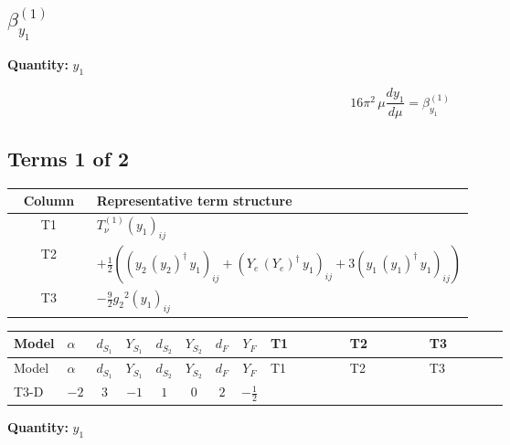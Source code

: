 \documentclass[8pt]{article}
\begin{document}
\begin{landscape}
\section*{$\beta_{y_1}^{(1)}$}
\noindent\textbf{Quantity: }$y_1$\par\smallskip
\[16\pi^2\,\mu\frac{d y_1}{d\mu}=\beta_{y_1}^{(1)}\]
\subsection*{Terms 1 of 2}
\begin{center}
\begin{tabular}{@{}c >{\raggedright\arraybackslash}p{0.82\linewidth}@{}}
\toprule
Column & Representative term structure \\
\midrule
T1 & \(\displaystyle T_{\nu}^{(1)} \left({y_1}\right)_{ij}\) \\
\midrule
T2 & \(\displaystyle +\frac{1}{2} (\left({y_2}\,\left({y_2}\right)^{\dagger}\,{y_1}\right)_{ij}+\left({Y_e}\,\left({Y_e}\right)^{\dagger}\,{y_1}\right)_{ij}+3 \left({y_1}\,\left({y_1}\right)^{\dagger}\,{y_1}\right)_{ij})\) \\
\midrule
T3 & \(\displaystyle -\frac{9}{2} {g_2}^2 \left({y_1}\right)_{ij}\) \\
\midrule
\bottomrule
\end{tabular}
\end{center}
\smallskip
\tiny
\begin{longtable}{@{}llcccccc >{\raggedright\arraybackslash}p{0.21\linewidth} >{\raggedright\arraybackslash}p{0.21\linewidth} >{\raggedright\arraybackslash}p{0.21\linewidth}@{}}
\toprule
Model & $\alpha$ & $d_{S_1}$ & $Y_{S_1}$ & $d_{S_2}$ & $Y_{S_2}$ & $d_F$ & $Y_F$ & T1 & T2 & T3 \\
\midrule
\endfirsthead
\toprule
Model & $\alpha$ & $d_{S_1}$ & $Y_{S_1}$ & $d_{S_2}$ & $Y_{S_2}$ & $d_F$ & $Y_F$ & T1 & T2 & T3 \\
\midrule
\endhead
T3-D & $-2$ & $3$ & $-1$ & $1$ & $0$ & $2$ & $-\frac{1}{2}$ & \scriptsize\adjustbox{max width=\linewidth}{$\begin{gathered} T_{\nu}^{(1)} \left({y_1}\right)_{ij}\end{gathered}$} & \scriptsize\adjustbox{max width=\linewidth}{$\begin{gathered} +\frac{1}{2} (\left({y_2}\,\left({y_2}\right)^{\dagger}\,{y_1}\right)_{ij}+\left({Y_e}\,\left({Y_e}\right)^{\dagger}\,{y_1}\right)_{ij}+3 \left({y_1}\,\left({y_1}\right)^{\dagger}\,{y_1}\right)_{ij})\end{gathered}$} & \scriptsize\adjustbox{max width=\linewidth}{$\begin{gathered} -\frac{9}{2} {g_2}^2 \left({y_1}\right)_{ij}\end{gathered}$} \\
\midrule
\bottomrule
\end{longtable}
\clearpage
\noindent\textbf{Quantity: }$y_1$\par\smallskip

\end{landscape}
\end{document}
